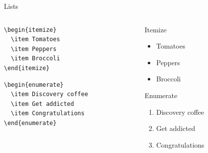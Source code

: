 \documentclass[xetex, onlymath]{beamer}
\begin{document}
\begin{frame}[fragile]{Lists}
\begin{columns}
\begin{column}{.5\linewidth}
\begin{lstlisting}
\begin{itemize}
  \item Tomatoes
  \item Peppers
  \item Broccoli
\end{itemize}
\end{lstlisting}

\begin{lstlisting}
\begin{enumerate}
  \item Discovery coffee
  \item Get addicted
  \item Congratulations
\end{enumerate}
\end{lstlisting}
\end{column}

\begin{column}{.4\linewidth}
\begin{exampleblock}{Itemize}
	\begin{itemize}
		\item Tomatoes
		\item Peppers
		\item Broccoli
	\end{itemize}
\end{exampleblock}
\begin{exampleblock}{Enumerate}
	\begin{enumerate}
		\item Discovery coffee
		\item Get addicted
		\item Congratulations
	\end{enumerate}
\end{exampleblock}
\end{column}
\end{columns}
\end{frame}
\end{document}
